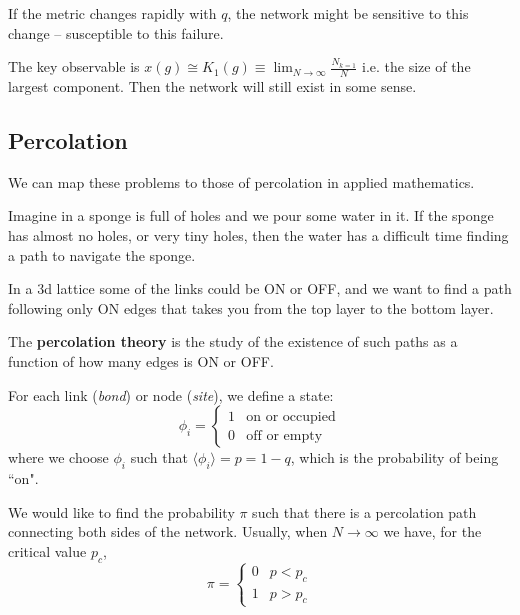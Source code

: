 \documentclass[12pt]{article}
\theoremstyle{definition}
\begin{document}
If the metric changes rapidly with $q$, the network might be sensitive to this change -- susceptible to this failure.

The key observable is $x(g)\cong K_1(g)\equiv \lim_{N\to \infty} \frac{N_{k=1}}{N}$ i.e. the size of the largest component. Then the network will still exist in some sense.

\subsection{Percolation}

We can map these problems to those of percolation in applied mathematics.

Imagine in a sponge is full of holes and we pour some water in it. If the sponge has almost no holes, or very tiny holes, then the water has a difficult time finding a path to navigate the sponge. 

In a 3d lattice some of the links could be ON or OFF, and we want to find a path following only ON edges that takes you from the top layer to the bottom layer. 

The \textbf{percolation theory} is the study of the existence of such paths as a function of how many edges is ON or OFF. 

For each link (\textit{bond}) or node (\textit{site}), we define a state: 
\[
\phi_i=
\begin{cases}
    1 & \text{on or occupied} \\
    0 & \text{off or empty}
\end{cases}
\]
where we choose $\phi_i$ such that $\langle\phi_i\rangle=p=1-q$, which is the probability of being ``on". 

We would like to find the probability $\pi$ such that there is a percolation path connecting both sides of the network. Usually, when $N\to\infty$ we have, for the critical value $p_c$,
\[
\pi=
\begin{cases}
    0 & p<p_c \\
    1 & p>p_c
\end{cases}
\]
\end{document}

